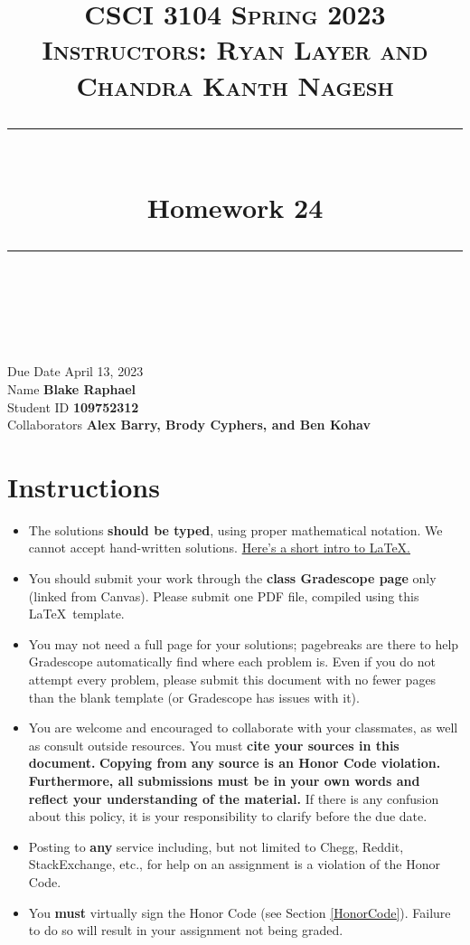 \documentclass[11pt]{article}
\title{
\normalfont \normalsize
\textsc{CSCI 3104 Spring 2023 \\
Instructors: Ryan Layer and Chandra Kanth Nagesh} \\
[10pt]
\rule{\linewidth}{0.5pt} \\[6pt]
\huge Homework 24 \\
\rule{\linewidth}{2pt}  \\[10pt]
}
\author{}
\date{}
\theoremstyle{definition}
\theoremstyle{definition}
\theoremstyle{definition}
\begin{document}

\maketitle


\noindent
Due Date \dotfill April 13, 2023 \\
Name \dotfill \textbf{Blake Raphael} \\
Student ID \dotfill \textbf{109752312} \\
Collaborators \dotfill \textbf{Alex Barry, Brody Cyphers, and Ben Kohav}

\tableofcontents

\section{Instructions}
 \begin{itemize}
	\item The solutions \textbf{should be typed}, using proper mathematical notation. We cannot accept hand-written solutions. \href{http://ece.uprm.edu/~caceros/latex/introduction.pdf}{Here's a short intro to \LaTeX.}
	\item You should submit your work through the \textbf{class Gradescope page} only (linked from Canvas). Please submit one PDF file, compiled using this \LaTeX \ template.
	\item You may not need a full page for your solutions; pagebreaks are there to help Gradescope automatically find where each problem is. Even if you do not attempt every problem, please submit this document with no fewer pages than the blank template (or Gradescope has issues with it).

	\item You are welcome and encouraged to collaborate with your classmates, as well as consult outside resources. You must \textbf{cite your sources in this document.} \textbf{Copying from any source is an Honor Code violation. Furthermore, all submissions must be in your own words and reflect your understanding of the material.} If there is any confusion about this policy, it is your responsibility to clarify before the due date. 

	\item Posting to \textbf{any} service including, but not limited to Chegg, Reddit, StackExchange, etc., for help on an assignment is a violation of the Honor Code.

	\item You \textbf{must} virtually sign the Honor Code (see Section \ref{HonorCode}). Failure to do so will result in your assignment not being graded.
\end{itemize}
\end{document}
